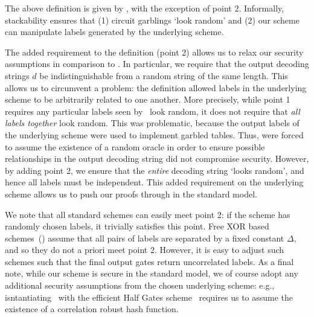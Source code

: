 The above definition is given by \HK, with the exception of point 2.
Informally, stackability ensures that (1) circuit garblings `look
random' and (2) our scheme can manipulate labels generated by the
underlying scheme.

The added requirement to the definition (point 2) allows us to relax
our security assumptions in comparison to \HK. In particular, we require that the output decoding
strings $d$ be indistinguishable from a random string of the same
length.  This allows us to circumvent a problem: the \HK definition allowed labels in the underlying
scheme to be arbitrarily related to one another.
More precisely, while point 1 requires any particular labels seen by
\E\ look random, it does not require that \emph{all labels together}
look random.
%
This was problematic, because the output labels of the
underlying scheme were used to implement garbled tables.
%
Thus, \HK were forced to assume the existence of a random oracle in
order to ensure possible relationships in the output decoding string
did not compromise security.
%
However, by adding point 2, we ensure that the \emph{entire} decoding
string `looks random', and hence all labels must be independent.
This added requirement on the underlying scheme allows us to push our
proofs through in the standard model.

We note that all standard schemes can easily meet point 2:
if the scheme has randomly chosen labels, it trivially satisfies this
point.
%
Free XOR based schemes~(\cite{ICALP:KolSch08}) assume that all
pairs of labels are separated by a fixed constant $\Delta$, and so
they do not a priori meet point 2. However, it is easy to adjust such
schemes such that the final output gates return uncorrelated labels.
%
As a final note, while our scheme is secure in the standard model, we
of course adopt any additional security assumptions from the chosen
underlying scheme: e.g., isntantiating \ourscheme\ with the efficient
Half Gates scheme~\cite{EPRINT:ZahRosEva14} requires us to assume the
existence of a correlation robust hash function.

